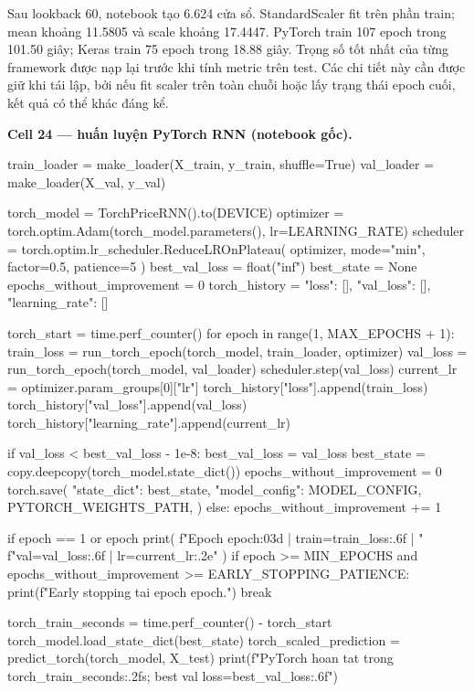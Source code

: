 \documentclass[12pt,a4paper]{report}
\begin{document}
Sau lookback 60, notebook tạo 6.624 cửa sổ. StandardScaler fit trên phần train; mean khoảng 11.5805 và scale khoảng 17.4447. PyTorch train 107 epoch trong 101.50 giây; Keras train 75 epoch trong 18.88 giây. Trọng số tốt nhất của từng framework được nạp lại trước khi tính metric trên test. Các chi tiết này cần được giữ khi tái lập, bởi nếu fit scaler trên toàn chuỗi hoặc lấy trạng thái epoch cuối, kết quả có thể khác đáng kể.

\par\medskip\noindent\textbf{Cell 24 --- huấn luyện PyTorch RNN (notebook gốc).}
\begin{NotebookCode}
train_loader = make_loader(X_train, y_train, shuffle=True)
val_loader = make_loader(X_val, y_val)

torch_model = TorchPriceRNN().to(DEVICE)
optimizer = torch.optim.Adam(torch_model.parameters(), lr=LEARNING_RATE)
scheduler = torch.optim.lr_scheduler.ReduceLROnPlateau(
    optimizer, mode="min", factor=0.5, patience=5
)
best_val_loss = float("inf")
best_state = None
epochs_without_improvement = 0
torch_history = {"loss": [], "val_loss": [], "learning_rate": []}

torch_start = time.perf_counter()
for epoch in range(1, MAX_EPOCHS + 1):
    train_loss = run_torch_epoch(torch_model, train_loader, optimizer)
    val_loss = run_torch_epoch(torch_model, val_loader)
    scheduler.step(val_loss)
    current_lr = optimizer.param_groups[0]["lr"]
    torch_history["loss"].append(train_loss)
    torch_history["val_loss"].append(val_loss)
    torch_history["learning_rate"].append(current_lr)

    if val_loss < best_val_loss - 1e-8:
        best_val_loss = val_loss
        best_state = copy.deepcopy(torch_model.state_dict())
        epochs_without_improvement = 0
        torch.save(
            {"state_dict": best_state, "model_config": MODEL_CONFIG},
            PYTORCH_WEIGHTS_PATH,
        )
    else:
        epochs_without_improvement += 1

    if epoch == 1 or epoch %
        print(
            f"Epoch {epoch:03d} | train={train_loss:.6f} | "
            f"val={val_loss:.6f} | lr={current_lr:.2e}"
        )
    if epoch >= MIN_EPOCHS and epochs_without_improvement >= EARLY_STOPPING_PATIENCE:
        print(f"Early stopping tai epoch {epoch}.")
        break

torch_train_seconds = time.perf_counter() - torch_start
torch_model.load_state_dict(best_state)
torch_scaled_prediction = predict_torch(torch_model, X_test)
print(f"PyTorch hoan tat trong {torch_train_seconds:.2f}s; best val loss={best_val_loss:.6f}")
\end{NotebookCode}
\end{document}
